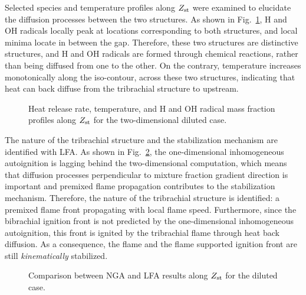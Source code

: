 \documentclass[review,3p,times]{elsarticle}
\begin{document}
\textcolor{dl}{Selected species and temperature profiles along $Z_{\rm st}$ were examined to elucidate the diffusion processes between the two structures.  As shown in Fig.~\ref{fig:1D_D}, H and OH radicals locally peak at locations corresponding to both structures, and local minima locate in between the gap.  Therefore, these two structures are distinctive structures, and H and OH radicals are formed through chemical reactions, rather than being diffused from one to the other.  On the contrary, temperature increases monotonically along the iso-contour, across these two structures, indicating that heat can back diffuse from the tribrachial structure to upstream.}

\begin{figure}
  \centering
  \scriptsize
  
  
  
  
  \normalsize
  \caption{Heat release rate, temperature, and H and OH radical mass fraction profiles along $Z_{\rm st}$ for the two-dimensional diluted case.}
  \label{fig:1D_D}
\end{figure}

\textcolor{dl}{The nature of the tribrachial structure and the stabilization mechanism are identified with LFA.  As shown in Fig.~\ref{fig:LFA_D}, the one-dimensional inhomogeneous autoignition is lagging behind the two-dimensional computation, which means that diffusion processes perpendicular to mixture fraction gradient direction is important and premixed flame propagation contributes to the stabilization mechanism.  Therefore, the nature of the tribrachial structure is identified: a premixed flame front propagating with local flame speed.  Furthermore, since the bibrachial ignition front is not predicted by the one-dimensional inhomogeneous autoignition, this front is ignited by the tribrachial flame through heat back diffusion.  As a consequence, the flame and the flame supported ignition front are still \emph{kinematically} stabilized.} 

\begin{figure}
  \centering
  \scriptsize
  
  \normalsize
  \caption{Comparison between NGA and LFA results along $Z_{\rm st}$ for the diluted case.}
  \label{fig:LFA_D}
\end{figure}
\end{document}
